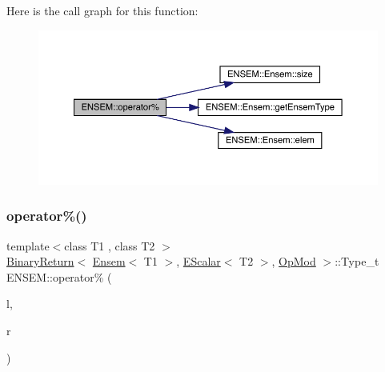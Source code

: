 Here is the call graph for this function\+:\nopagebreak
\begin{figure}[H]
\begin{center}
\leavevmode
\includegraphics[width=350pt]{d1/d9e/group__eensem_gaf077fbdf11a765fcbfe7fbb3b9e94a02_cgraph}
\end{center}
\end{figure}
\mbox{\label{group__eensem_gac6f1dfc7f3ac04dea5a10016a1cf8994}} 
\subsubsection{\texorpdfstring{operator\%()}{operator\%()}\hspace{0.1cm}{\footnotesize\ttfamily [2/3]}}
{\footnotesize\ttfamily template$<$class T1 , class T2 $>$ \\
\mbox{\hyperlink{structENSEM_1_1BinaryReturn}{Binary\+Return}}$<$ \mbox{\hyperlink{classENSEM_1_1Ensem}{Ensem}}$<$ T1 $>$, \mbox{\hyperlink{classENSEM_1_1EScalar}{E\+Scalar}}$<$ T2 $>$, \mbox{\hyperlink{structENSEM_1_1OpMod}{Op\+Mod}} $>$\+::Type\+\_\+t E\+N\+S\+E\+M\+::operator\% (\begin{DoxyParamCaption}\item[{const \mbox{\hyperlink{classENSEM_1_1Ensem}{Ensem}}$<$ T1 $>$ \&}]{l,  }\item[{const \mbox{\hyperlink{classENSEM_1_1EScalar}{E\+Scalar}}$<$ T2 $>$ \&}]{r }\end{DoxyParamCaption})\hspace{0.3cm}{\ttfamily [inline]}}

